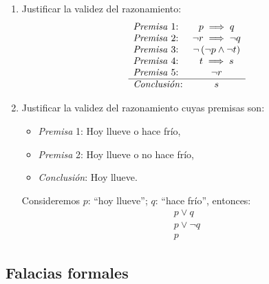 \begin{fmd-example}
	\begin{enumerate}
		\item Justificar la validez del razonamiento:
		\[
		\begin{array}{lc}
			\mbox{\textit{Premisa} 1:} & p \implies q\\
			\mbox{\textit{Premisa} 2:} & \neg r \implies \neg q \\
			\mbox{\textit{Premisa} 3:} & \neg \left( \neg p \land \neg t \right) \\
			\mbox{\textit{Premisa} 4:} & t \implies s \\
			\mbox{\textit{Premisa} 5:} & \neg r \\ \hline
			\mbox{\textit{Conclusión}:} & s
		\end{array}
		\]
		\item Justificar la validez del razonamiento cuyas premisas son:
		\begin{itemize}
			\item \textit{Premisa} 1: Hoy llueve o hace frío,
			\item \textit{Premisa} 2: Hoy llueve o no hace frío,
			\item \textit{Conclusión}: Hoy llueve.
		\end{itemize}
		
		Consideremos $p$: ``hoy llueve''; $q$: ``hace frío'', entonces:
		\[ 
		\begin{array}{l}
			p \lor q\\
			p \lor \neg q \\ \hline
			p
		\end{array}
		\]
	\end{enumerate}
\end{fmd-example}

\subsection{Falacias formales}

